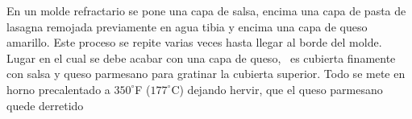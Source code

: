 En un molde refractario se pone una capa de salsa, encima una capa de pasta de lasagna remojada previamente en agua tibia y encima una capa de queso amarillo. Este proceso se repite varias veces hasta llegar al borde del molde. Lugar en el cual se debe acabar con una capa de queso,  es cubierta finamente con salsa y queso parmesano para gratinar la cubierta superior. Todo se mete en horno precalentado a $350^\circ$F ($177^\circ$C) dejando hervir, que el queso parmesano quede derretido\\





